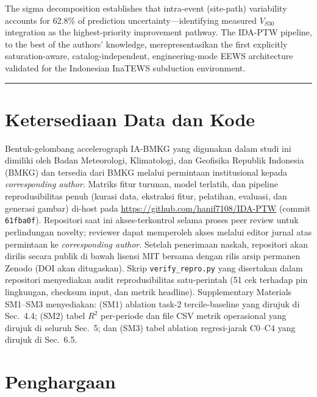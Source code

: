 \documentclass[10pt]{article}
\begin{document}
The sigma decomposition establishes that intra-event (site-path) variability accounts for 62.8\% of prediction uncertainty---identifying measured \(V_{S30}\) integration as the highest-priority improvement pathway. The IDA-PTW pipeline, to the best of the authors' knowledge, merepresentasikan the first explicitly saturation-aware, catalog-independent, engineering-mode EEWS architecture validated for the Indonesian InaTEWS subduction environment.

\begin{center}\rule{0.5\linewidth}{0.5pt}\end{center}






\section*{Ketersediaan Data dan Kode}

Bentuk-gelombang accelerograph IA-BMKG yang digunakan dalam studi ini dimiliki oleh
Badan Meteorologi, Klimatologi, dan Geofisika Republik Indonesia (BMKG) dan
tersedia dari BMKG melalui permintaan institusional kepada \emph{corresponding author}.
Matriks fitur turunan, model terlatih, dan pipeline reprodusibilitas penuh
(kurasi data, ekstraksi fitur, pelatihan, evaluasi, dan generasi gambar)
di-host pada \url{https://github.com/hanif7108/IDA-PTW} (commit \texttt{61fba0f}).
Repositori saat ini akses-terkontrol selama proses peer review untuk perlindungan
novelty; reviewer dapat memperoleh akses melalui editor jurnal atas permintaan
ke \emph{corresponding author}. Setelah penerimaan naskah, repositori akan dirilis
secara publik di bawah lisensi MIT bersama dengan rilis arsip permanen Zenodo
(DOI akan ditugaskan). Skrip \texttt{verify\_repro.py} yang disertakan dalam
repositori menyediakan audit reprodusibilitas satu-perintah (51 cek terhadap
pin lingkungan, checksum input, dan metrik headline). Supplementary Materials
SM1--SM3 menyediakan: (SM1) ablation task-2 tercile-baseline yang dirujuk di
Sec.~4.4; (SM2) tabel $R^2$ per-periode dan file CSV metrik operasional yang
dirujuk di seluruh Sec.~5; dan (SM3) tabel ablation regresi-jarak C0--C4 yang
dirujuk di Sec.~6.5.

\section*{Penghargaan}
\end{document}

